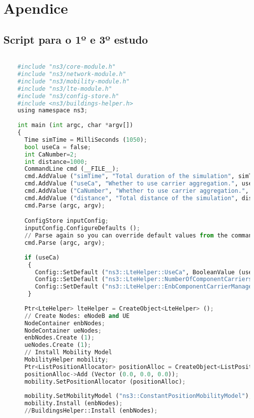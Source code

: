 \chapter{Apendice} \label{int}
\section{Script para o 1º e 3º estudo} \label{ex1}
\begin{lstlisting}[language=Python, label=py_script, basicstyle=\fontsize{10.5}{12.5}\selectfont]

	#include "ns3/core-module.h"
	#include "ns3/network-module.h"
	#include "ns3/mobility-module.h"
	#include "ns3/lte-module.h"
	#include "ns3/config-store.h"
	#include <ns3/buildings-helper.h>
	using namespace ns3;
	
	int main (int argc, char *argv[])
	{
	  Time simTime = MilliSeconds (1050);
	  bool useCa = false;
	  int CaNumber=2;  
	  int distance=1000;  
	  CommandLine cmd (__FILE__);
	  cmd.AddValue ("simTime", "Total duration of the simulation", simTime);
	  cmd.AddValue ("useCa", "Whether to use carrier aggregation.", useCa);
	  cmd.AddValue ("CaNumber", "Whether to use carrier aggregation.", CaNumber);
	  cmd.AddValue ("distance", "Total distance of the simulation", distance);
	  cmd.Parse (argc, argv);

	  ConfigStore inputConfig;
	  inputConfig.ConfigureDefaults ();
	  // Parse again so you can override default values from the command line
	  cmd.Parse (argc, argv);
	
	  if (useCa)
	   {
		 Config::SetDefault ("ns3::LteHelper::UseCa", BooleanValue (useCa));
		 Config::SetDefault ("ns3::LteHelper::NumberOfComponentCarriers", UintegerValue (CaNumber));
		 Config::SetDefault ("ns3::LteHelper::EnbComponentCarrierManager", StringValue ("ns3::RrComponentCarrierManager"));
	   }
	
	  Ptr<LteHelper> lteHelper = CreateObject<LteHelper> ();
	  // Create Nodes: eNodeB and UE
	  NodeContainer enbNodes;
	  NodeContainer ueNodes;
	  enbNodes.Create (1);
	  ueNodes.Create (1);
	  // Install Mobility Model
	  MobilityHelper mobility;
	  Ptr<ListPositionAllocator> positionAlloc = CreateObject<ListPositionAllocator> ();
	  positionAlloc->Add (Vector (0.0, 0.0, 0.0)); 
	  mobility.SetPositionAllocator (positionAlloc);
	  
	  mobility.SetMobilityModel ("ns3::ConstantPositionMobilityModel");
	  mobility.Install (enbNodes);
	  //BuildingsHelper::Install (enbNodes);
	  

\end{lstlisting}
